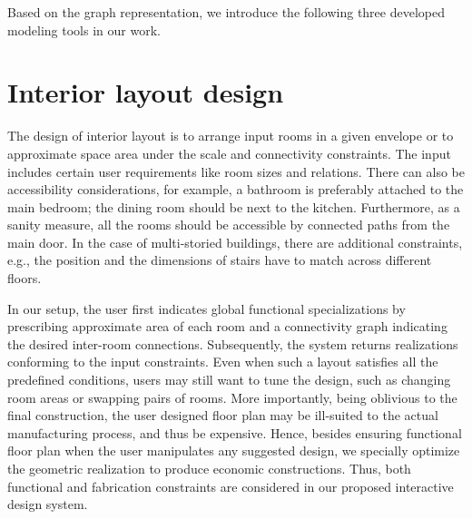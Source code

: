 
Based on the graph representation, we introduce the following three developed modeling tools in our work.

\section{Interior layout design}

The design of interior layout is to arrange input rooms in a given envelope or to approximate space area under the scale and connectivity constraints. The input includes certain user requirements like room sizes and relations. There can also be accessibility considerations, for example, a bathroom is preferably attached to the main bedroom; the dining room should be next to the kitchen. Furthermore, as a sanity measure, all the rooms should be accessible by connected paths from the main door. In the case of multi-storied buildings, there are additional constraints, e.g., the position and the dimensions of stairs have to match across different floors.

In our setup, the user first indicates global functional specializations by prescribing approximate area of each room and a connectivity graph indicating the desired inter-room connections. Subsequently, the system returns realizations conforming to the input constraints. Even when such a layout satisfies all the predefined conditions, users may still want to tune the design, such as changing room areas or swapping pairs of rooms. More importantly, being oblivious to the final construction, the user designed floor plan may be ill-suited to the actual manufacturing process, and thus be expensive. Hence, besides ensuring functional floor plan when the user manipulates any suggested design, we specially optimize the geometric realization to produce economic constructions. Thus, both functional and fabrication constraints are considered in our proposed interactive design system.


